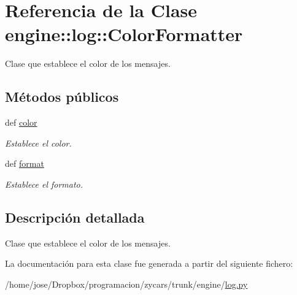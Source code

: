 \hypertarget{classengine_1_1log_1_1ColorFormatter}{
\section{\-Referencia de la \-Clase engine\-:\-:log\-:\-:\-Color\-Formatter}
\label{classengine_1_1log_1_1ColorFormatter}
}


\-Clase que establece el color de los mensajes.  


\subsection*{\-Métodos públicos}
\begin{DoxyCompactItemize}
\item 
\hypertarget{classengine_1_1log_1_1ColorFormatter_aa0db860905bd1430edc2e8ce586f9778}{
def \hyperlink{classengine_1_1log_1_1ColorFormatter_aa0db860905bd1430edc2e8ce586f9778}{color}}
\label{classengine_1_1log_1_1ColorFormatter_aa0db860905bd1430edc2e8ce586f9778}

\begin{DoxyCompactList}\small\item\em \-Establece el color. \end{DoxyCompactList}\item 
\hypertarget{classengine_1_1log_1_1ColorFormatter_a9ef2d1ba5e9444026d09cc78ec4c722a}{
def \hyperlink{classengine_1_1log_1_1ColorFormatter_a9ef2d1ba5e9444026d09cc78ec4c722a}{format}}
\label{classengine_1_1log_1_1ColorFormatter_a9ef2d1ba5e9444026d09cc78ec4c722a}

\begin{DoxyCompactList}\small\item\em \-Establece el formato. \end{DoxyCompactList}\end{DoxyCompactItemize}


\subsection{\-Descripción detallada}
\-Clase que establece el color de los mensajes. 

\-La documentación para esta clase fue generada a partir del siguiente fichero\-:\begin{DoxyCompactItemize}
\item 
/home/jose/\-Dropbox/programacion/zycars/trunk/engine/\hyperlink{log_8py}{log.\-py}\end{DoxyCompactItemize}
